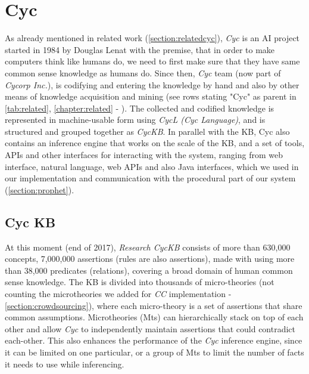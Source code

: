 \section{Cyc}
\label{section:Cyc}
As already mentioned in related work (\autoref{section:relatedcyc}), \emph{Cyc}
is an AI project started in 1984 by Douglas Lenat\parencite{Lenat1985} with the
premise, that in order to make computers think like humans do, we need to first
make sure that they have same common sense knowledge as humans do. Since then,
\emph {Cyc} team (now part of \emph{Cycorp Inc.}), is codifying and entering 
the knowledge by hand and also by other means of knowledge acquisition and 
mining (see rows stating "Cyc" as parent in \autoref{tab:related}, 
\autoref{chapter:related} - ). 
The collected and codified knowledge is represented in machine-usable form 
using \emph{CycL (Cyc Language)}, and is structured and grouped together as
\emph{CycKB}. In parallel with the KB, Cyc also contains an inference engine
that works on the scale of the KB, and a set of tools, APIs and other interfaces
for interacting with the system, ranging from web interface, natural language,
web APIs and also Java interfaces, which we used in our implementation and
communication with the procedural part of our system 
(\autoref{section:prophet}).

\subsection{Cyc KB}
\label{section:cyckb}
At this moment (end of 2017), \emph{Research CycKB} consists of more than 
630,000 concepts, 7,000,000 assertions (rules are also assertions), made with
using more than 38,000 predicates (relations), covering a broad domain of
human common sense knowledge. The KB is divided into thousands of micro-theories
(not counting the microtheories we added for \emph{CC} implementation - 
\autoref{section:crowdsourcing}), where each micro-theory is a set of assertions
that share common assumptions. Microtheories (Mts) can hierarchically stack on 
top of each other and allow \emph{Cyc} to independently maintain assertions that
could contradict each-other. This also enhances the performance of the 
\emph{Cyc} inference engine, since it can be limited on one particular, or a
group of Mts to limit the number of facts it needs to use while inferencing.

